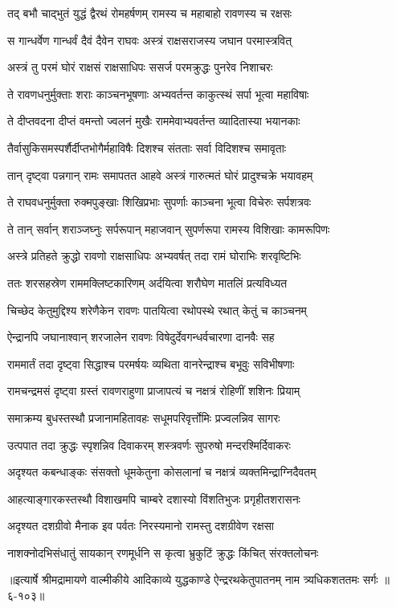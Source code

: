 \twolineshloka
{तद् बभौ चाद्भुतं युद्धं द्वैरथं रोमहर्षणम्}
{रामस्य च महाबाहो रावणस्य च रक्षसः} %

\twolineshloka
{स गान्धर्वेण गान्धर्वं दैवं दैवेन राघवः}
{अस्त्रं राक्षसराजस्य जघान परमास्त्रवित्} %

\twolineshloka
{अस्त्रं तु परमं घोरं राक्षसं राक्षसाधिपः}
{ससर्ज परमक्रुद्धः पुनरेव निशाचरः} %

\twolineshloka
{ते रावणधनुर्मुक्ताः शराः काञ्चनभूषणाः}
{अभ्यवर्तन्त काकुत्स्थं सर्पा भूत्वा महाविषाः} %

\twolineshloka
{ते दीप्तवदना दीप्तं वमन्तो ज्वलनं मुखैः}
{राममेवाभ्यवर्तन्त व्यादितास्या भयानकाः} %

\twolineshloka
{तैर्वासुकिसमस्पर्शैर्दीप्तभोगैर्महाविषैः}
{दिशश्च संतताः सर्वा विदिशश्च समावृताः} %

\twolineshloka
{तान् दृष्ट्वा पन्नगान् रामः समापतत आहवे}
{अस्त्रं गारुत्मतं घोरं प्रादुश्चक्रे भयावहम्} %

\twolineshloka
{ते राघवधनुर्मुक्ता रुक्मपुङ्खाः शिखिप्रभाः}
{सुपर्णाः काञ्चना भूत्वा विचेरुः सर्पशत्रवः} %

\twolineshloka
{ते तान् सर्वान् शराञ्जघ्नुः सर्परूपान् महाजवान्}
{सुपर्णरूपा रामस्य विशिखाः कामरूपिणः} %

\twolineshloka
{अस्त्रे प्रतिहते क्रुद्धो रावणो राक्षसाधिपः}
{अभ्यवर्षत् तदा रामं घोराभिः शरवृष्टिभिः} %

\twolineshloka
{ततः शरसहस्रेण राममक्लिष्टकारिणम्}
{अर्दयित्वा शरौघेण मातलिं प्रत्यविध्यत} %

\twolineshloka
{चिच्छेद केतुमुद्दिश्य शरेणैकेन रावणः}
{पातयित्वा रथोपस्थे रथात् केतुं च काञ्चनम्} %

\twolineshloka
{ऐन्द्रानपि जघानाश्वान् शरजालेन रावणः}
{विषेदुर्देवगन्धर्वचारणा दानवैः सह} %

\twolineshloka
{राममार्तं तदा दृष्ट्वा सिद्धाश्च परमर्षयः}
{व्यथिता वानरेन्द्राश्च बभूवुः सविभीषणाः} %

\twolineshloka
{रामचन्द्रमसं दृष्ट्वा ग्रस्तं रावणराहुणा}
{प्राजापत्यं च नक्षत्रं रोहिणीं शशिनः प्रियाम्} %

\twolineshloka
{समाक्रम्य बुधस्तस्थौ प्रजानामहितावहः}
{सधूमपरिवृर्त्तोमिः प्रज्वलन्निव सागरः} %

\twolineshloka
{उत्पपात तदा क्रुद्धः स्पृशन्निव दिवाकरम्}
{शस्त्रवर्णः सुपरुषो मन्दरश्मिर्दिवाकरः} %

\twolineshloka
{अदृश्यत कबन्धाङ्कः संसक्तो धूमकेतुना}
{कोसलानां च नक्षत्रं व्यक्तमिन्द्राग्निदैवतम्} %

\twolineshloka
{आहत्याङ्गारकस्तस्थौ विशाखमपि चाम्बरे}
{दशास्यो विंशतिभुजः प्रगृहीतशरासनः} %

\twolineshloka
{अदृश्यत दशग्रीवो मैनाक इव पर्वतः}
{निरस्यमानो रामस्तु दशग्रीवेण रक्षसा} %

\twolineshloka
{नाशक्नोदभिसंधातुं सायकान् रणमूर्धनि}
{स कृत्वा भ्रुकुटिं क्रुद्धः किंचित् संरक्तलोचनः} %


॥इत्यार्षे श्रीमद्रामायणे वाल्मीकीये आदिकाव्ये युद्धकाण्डे ऐन्द्ररथकेतुपातनम् नाम त्र्यधिकशततमः सर्गः ॥६-१०३॥
